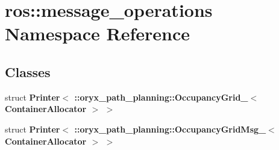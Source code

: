 \section{ros\-:\-:message\-\_\-operations \-Namespace \-Reference}
\label{namespaceros_1_1message__operations}
\subsection*{\-Classes}
\begin{DoxyCompactItemize}
\item 
struct {\bf \-Printer$<$ \-::oryx\-\_\-path\-\_\-planning\-::\-Occupancy\-Grid\-\_\-$<$ Container\-Allocator $>$ $>$}
\item 
struct {\bf \-Printer$<$ \-::oryx\-\_\-path\-\_\-planning\-::\-Occupancy\-Grid\-Msg\-\_\-$<$ Container\-Allocator $>$ $>$}
\end{DoxyCompactItemize}
